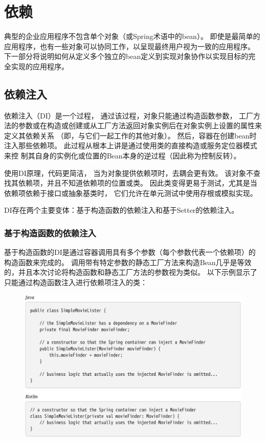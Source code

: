 \section{依赖}
典型的企业应用程序不包含单个对象（或Spring术语中的bean）。 即使是最简单的应用程序，也有一些对象可以协同工作，以呈现最终用户视为一致的应用程序。 下一部分将说明如何从定义多个独立的bean定义到实现对象协作以实现目标的完全实现的应用程序。

\subsection{依赖注入}

依赖注入（DI）是一个过程，
通过该过程，对象只能通过构造函数参数，
工厂方法的参数或在构造或创建或从工厂方法返回对象实例后在对象实例上设置的属性来定义其依赖关系
（即，与它们一起工作的其他对象）。 然后，容器在创建bean时注入那些依赖项。 
此过程从根本上讲是通过使用类的直接构造或服务定位器模式来控
制其自身的实例化或位置的Bean本身的逆过程（因此称为控制反转）。

使用DI原理，代码更简洁，
当为对象提供依赖项时，去耦会更有效。 
该对象不查找其依赖项，并且不知道依赖项的位置或类。 
因此类变得更易于测试，尤其是当依赖项依赖于接口或抽象基类时，
它们允许在单元测试中使用存根或模拟实现。

DI存在两个主要变体：基于构造函数的依赖注入和基于Setter的依赖注入。

\subsubsection{基于构造函数的依赖注入}
基于构造函数的DI是通过容器调用具有多个参数（每个参数代表一个依赖项）的构造函数来完成的。 调用带有特定参数的静态工厂方法来构造Bean几乎是等效的，并且本次讨论将构造函数和静态工厂方法的参数视为类似。 以下示例显示了只能通过构造函数注入进行依赖项注入的类：

\begin{figure}[ht]
    \centering
    \includegraphics[width=1\linewidth]{./Figure/IMG_code_21.png}
\end{figure}

